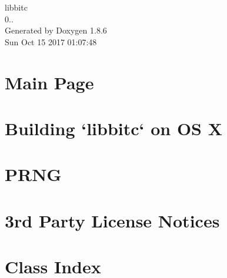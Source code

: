 \documentclass[twoside]{book}
\newcommand{\clearemptydoublepage}{%
  \newpage{\pagestyle{empty}\cleardoublepage}%
}
\begin{document}
\hypersetup{pageanchor=false}
\begin{titlepage}
\vspace*{7cm}
\begin{center}%
{\Large libbitc \\[1ex]\large 0.. }\\
\vspace*{1cm}
{\large Generated by Doxygen 1.8.6}\\
\vspace*{0.5cm}
{\small Sun Oct 15 2017 01:07:48}\\
\end{center}
\end{titlepage}
\clearemptydoublepage
\tableofcontents
\clearemptydoublepage
{}
\hypersetup{pageanchor=true}

\chapter{Main Page}
\label{index}\hypertarget{index}{}
\chapter{Building `libbitc` on O\-S X}
\label{md__home_ubuntu_workspace_doc_build-osx}
\hypertarget{md__home_ubuntu_workspace_doc_build-osx}{}

\chapter{P\-R\-N\-G}
\label{md__home_ubuntu_workspace_doc_PRNG}
\hypertarget{md__home_ubuntu_workspace_doc_PRNG}{}

\chapter{3rd Party License Notices}
\label{md__home_ubuntu_workspace_LICENSE-3RD-PARTY}
\hypertarget{md__home_ubuntu_workspace_LICENSE-3RD-PARTY}{}

\chapter{Class Index}

\end{document}
